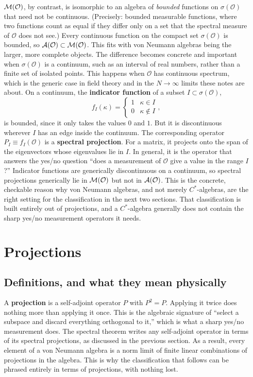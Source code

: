 $\mathcal{M}(\mathcal O)$, by contrast, is isomorphic to an algebra of \emph{bounded} functions on $\sigma(\mathcal O)$
that need not be continuous. (Precisely: bounded measurable functions, where two functions count as equal if
they differ only on a set that the spectral measure of $\mathcal O$ does not see.) Every continuous function
on the compact set $\sigma(\mathcal O)$ is bounded, so $\mathcal{A}(\mathcal O)\subset\mathcal{M}(\mathcal O)$. This fits with
von Neumann algebras being the larger, more complete objects. The difference becomes concrete and important
when $\sigma(\mathcal O)$ is a continuum, such as an interval of real numbers, rather than a finite set of
isolated points. This happens when $\mathcal O$ has continuous spectrum, which is the generic case in field
theory and in the $N\to\infty$ limits these notes are about. On a continuum, the \textbf{indicator function} of a
subset $I\subset\sigma(\mathcal O)$,
\[
f_I(\kappa) = \begin{cases} 1 & \kappa\in I \\ 0 & \kappa\notin I \end{cases} ,
\]
is bounded, since it only takes the values $0$ and $1$. But it is discontinuous wherever $I$ has an edge
inside the continuum. The corresponding operator $P_I\equiv f_I(\mathcal O)$ is a \textbf{spectral
projection}. For a matrix, it projects onto the span of the eigenvectors whose eigenvalues lie in $I$. In
general, it is the operator that answers the yes/no question ``does a measurement of $\mathcal O$ give a value
in the range $I$?'' Indicator functions are generically discontinuous on a continuum, so spectral projections
generically lie in $\mathcal{M}(\mathcal O)$ but not in $\mathcal{A}(\mathcal O)$. This is the concrete, checkable reason why
von Neumann algebras, and not merely $C^*$-algebras, are the right setting for the classification in the next
two sections. That classification is built entirely out of projections, and a $C^*$-algebra generally does
not contain the sharp yes/no measurement operators it needs.

\section{Projections}

\subsection*{Definitions, and what they mean physically}

A \textbf{projection} is a self-adjoint operator $P$ with $P^2=P$. Applying it twice does nothing more than
applying it once. This is the algebraic signature of ``select a subspace and discard everything orthogonal to
it,'' which is what a sharp yes/no measurement does. The spectral theorem writes any self-adjoint operator in
terms of its spectral projections, as discussed in the previous section. As a result, every element of a von
Neumann algebra is a norm limit of finite linear combinations of projections in the algebra. This is why the
classification that follows can be phrased entirely in terms of projections, with nothing lost.

